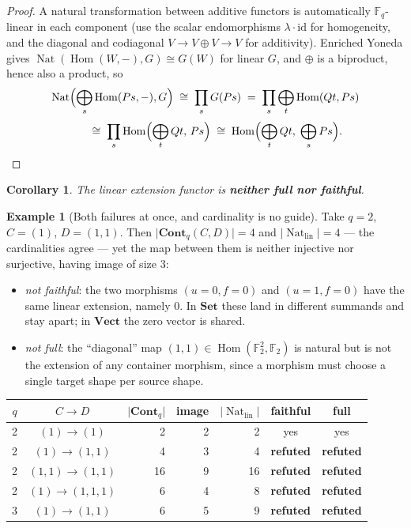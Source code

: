 \documentclass[11pt,a4paper]{article}
\newtheorem{corollary}[theorem]{Corollary}
\theoremstyle{definition}
\newtheorem{example}[theorem]{Example}
\theoremstyle{remark}
\newcommand{\FF}{\mathbb{F}}
\newcommand{\cat}[1]{\mathbf{#1}}
\newcommand{\Set}{\cat{Set}}
\newcommand{\Vect}{\cat{Vect}}
\newcommand{\Cont}{\cat{Cont}}
\DeclareMathOperator{\Hom}{Hom}
\DeclareMathOperator{\Nat}{Nat}
\newcommand{\NO}{\textcolor{nored}{\textbf{refuted}}}
\begin{document}
\begin{proof}
A natural transformation between additive functors is automatically
$\FF_q$-linear in each component (use the scalar endomorphisms $\lambda\cdot\mathrm{id}$
for homogeneity, and the diagonal and codiagonal $V \to V \oplus V \to V$ for
additivity). Enriched Yoneda gives $\Nat(\Hom(W,-), G) \cong G(W)$ for linear $G$,
and $\oplus$ is a biproduct, hence also a product, so
\[
  \Nat\Bigl(\bigoplus_s \Hom(P s,-), G\Bigr)
  \;\cong\; \prod_s G(P s)
  \;=\; \prod_s \bigoplus_t \Hom(Q t, P s)
\]
\[
  \phantom{\Nat}\;\cong\; \prod_s \Hom\Bigl(\bigoplus_t Q t,\, P s\Bigr)
  \;\cong\; \Hom\Bigl(\bigoplus_t Q t,\; \bigoplus_s P s\Bigr). \qedhere
\]
\end{proof}

\begin{corollary}
The linear extension functor is \textbf{neither full nor faithful}.
\end{corollary}

\begin{example}[Both failures at once, and cardinality is no guide]
Take $q = 2$, $C = (1)$, $D = (1,1)$. Then
$\lvert\Cont_q(C,D)\rvert = 4$ and $\lvert\Nat_{\mathrm{lin}}\rvert = 4$ --- the
cardinalities agree --- yet the map between them is neither injective nor
surjective, having image of size $3$:
\begin{itemize}[nosep]
  \item \emph{not faithful}: the two morphisms $(u = 0, f = 0)$ and
        $(u = 1, f = 0)$ have the same linear extension, namely $0$. In $\Set$
        these land in different summands and stay apart; in $\Vect$ the zero
        vector is shared.
  \item \emph{not full}: the ``diagonal'' map $(1,1) \in \Hom(\FF_2^{2}, \FF_2)$
        is natural but is not the extension of any container morphism, since a
        morphism must choose a single target shape per source shape.
\end{itemize}
\end{example}

\begin{center}
\small
\begin{tabular}{ccrrrcc}
\toprule
$q$ & $C \to D$ & $\lvert\Cont_q\rvert$ & image & $\lvert\Nat_{\mathrm{lin}}\rvert$ & faithful & full \\
\midrule
2 & $(1) \to (1)$ & 2 & 2 & 2 & yes & yes \\
2 & $(1) \to (1,1)$ & 4 & 3 & 4 & \NO & \NO \\
2 & $(1,1) \to (1,1)$ & 16 & 9 & 16 & \NO & \NO \\
2 & $(1) \to (1,1,1)$ & 6 & 4 & 8 & \NO & \NO \\
3 & $(1) \to (1,1)$ & 6 & 5 & 9 & \NO & \NO \\
\bottomrule
\end{tabular}
\end{center}
\end{document}
